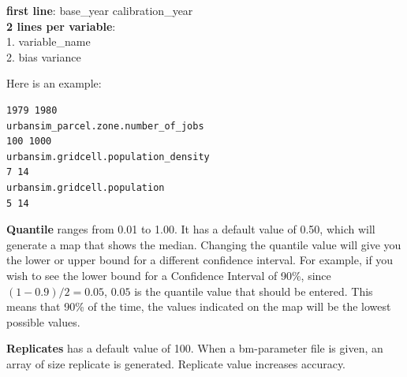 {\bf first line}: base_year calibration_year \\
{\bf 2 lines per variable}: \\
\hspace*{1cm} 1. variable_name \\
\hspace*{1cm} 2. bias variance

Here is an example:
\begin{verbatim}
1979 1980
urbansim_parcel.zone.number_of_jobs
100 1000
urbansim.gridcell.population_density
7 14
urbansim.gridcell.population
5 14
\end{verbatim}

{\bf Quantile} ranges from 0.01 to 1.00. It has a default value of
0.50, which will generate a map that shows the median. Changing the
quantile value will give you the lower or upper bound for a different
confidence interval. For example, if you wish to see the lower bound
for a Confidence Interval of 90\%, since $(1-0.9)/2 = 0.05$, $0.05$ is
the quantile value that should be entered.  This means that 90\% of
the time, the values indicated on the map will be the lowest possible
values.

{\bf Replicates} has a default value of 100. When a bm-parameter file
is given, an array of size replicate is generated. Replicate value
increases accuracy.

